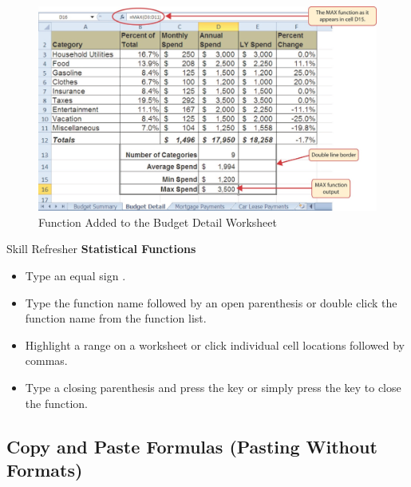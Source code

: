 \begin{figure}[H]
	\centering
	\includegraphics[width=\maxwidth{.95\linewidth}]{gfx/ch02_fig25}
	\caption{ Function Added to the Budget Detail Worksheet}
	\label{02:fig25}
\end{figure}

\begin{center}
	\begin{sklbox}{Skill Refresher}
		\textbf{Statistical Functions}
		\\
		\begin{itemize}
			\setlength{\itemsep}{0pt}
			\setlength{\parskip}{0pt}
			\setlength{\parsep}{0pt}

			\item Type an equal sign \fmtTyping{=}.
			\item Type the function name followed by an open parenthesis \fmtTyping{(} or double click the function name from the function list.
			\item Highlight a range on a worksheet or click individual cell locations followed by commas.
			\item Type a closing parenthesis \fmtTyping{)} and press the  key or simply press the  key to close the function.
			
		\end{itemize}
	\end{sklbox}
\end{center}

\subsection{Copy and Paste Formulas (Pasting Without Formats)}

